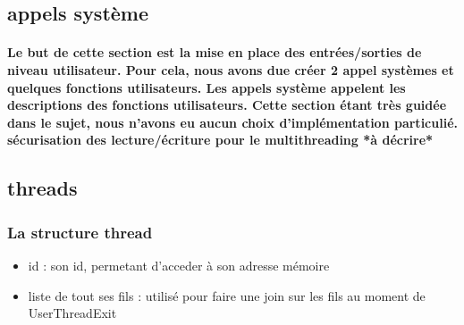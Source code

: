 \documentclass{report}
\begin{document}
	\subsection{appels système}
		\paragraph{Le but de cette section est la mise en place des entrées/sorties de niveau utilisateur. Pour cela, nous avons due créer 2 appel systèmes et quelques fonctions utilisateurs. Les appels système appelent les descriptions des fonctions utilisateurs. Cette section étant très guidée dans le sujet, nous n'avons eu aucun choix d'implémentation particulié.
		sécurisation des lecture/écriture pour le multithreading
		*à décrire*}
	\subsection{threads}
		\subsubsection{La structure thread}
			\begin{itemize}
				\item id : son id, permetant d'acceder à son adresse mémoire
				\item liste de tout ses fils : utilisé pour faire une join sur les fils au moment de UserThreadExit
			\end{itemize}
\end{document}
